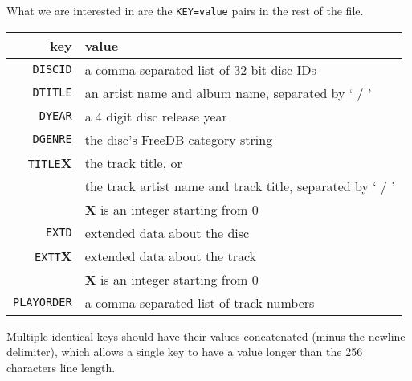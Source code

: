 What we are interested in are the \texttt{KEY=value} pairs in the
rest of the file.
\begin{table}[h]
{
\begin{tabular}{|r|l|}
\hline
key & value \\
\hline
\texttt{DISCID} & a comma-separated list of 32-bit disc IDs \\
\hline
\texttt{DTITLE} & an artist name and album name, separated by ` / ' \\
\hline
\texttt{DYEAR} & a 4 digit disc release year \\
\hline
\texttt{DGENRE} & the disc's FreeDB category string \\
\hline
\texttt{TITLE}\textbf{X} & the track title, or \\
& the track artist name and track title, separated by ` / ' \\
& \textbf{X} is an integer starting from 0 \\
\hline
\texttt{EXTD} & extended data about the disc \\
\hline
\texttt{EXTT}\textbf{X} & extended data about the track \\
& \textbf{X} is an integer starting from 0 \\
\hline
\texttt{PLAYORDER} & a comma-separated list of track numbers \\
\hline
\end{tabular}
}
\end{table}
\par
\noindent
Multiple identical keys should have their values
concatenated (minus the newline delimiter), which allows
a single key to have a value longer than the
256 characters line length.
